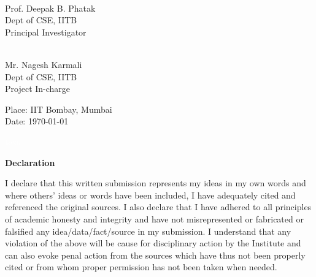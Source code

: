 \documentclass[12pt]{book}
\begin{document}
\vfill

\begin{multicols}{2}
\underline{\hspace{5cm}} \\
\indent Prof. Deepak B. Phatak \\
\indent Dept of CSE, IITB \\
\indent Principal Investigator \\

\begin{flushright}
\underline{\hspace{5cm}} \\
 Mr. Nagesh Karmali \\
\indent Dept of CSE, IITB \\
\indent Project In-charge \\
\end{flushright}
\end{multicols}

\vfill

 
Place: IIT Bombay, Mumbai \\
\indent Date: \today

 \pagebreak \thispagestyle{empty} \textcolor{white}{text} \pagebreak
 
\LARGE
\thispagestyle{empty}

\begin{center}
\textbf{Declaration}
\end{center}
\normalsize
I declare that this written submission represents my ideas in my own words and where 
others' ideas or words have been included, I have adequately cited and referenced the original 
sources.  I also declare that I have adhered to all principles of academic honesty and integrity 
and   have   not   misrepresented   or   fabricated   or   falsified   any   idea/data/fact/source   in   my 
submission.  I understand that any violation of the above will be cause for disciplinary action 
by the Institute and can also evoke  penal action from the sources which have thus not been 
properly cited or from whom proper permission has not been taken when needed.
\end{document}

